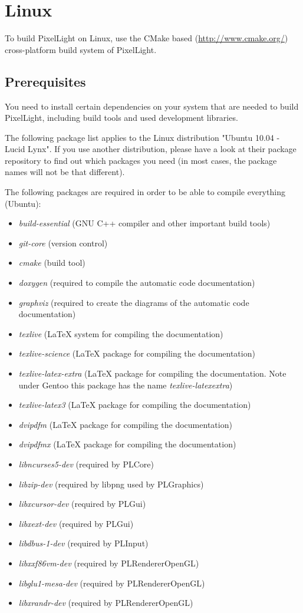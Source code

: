 \chapter{Linux}
To build PixelLight on Linux, use the CMake based (\url{http://www.cmake.org/}) cross-platform build system of PixelLight.




\section{Prerequisites}
You need to install certain dependencies on your system that are needed to build PixelLight, including build tools and used development libraries.

The following package list applies to the Linux distribution "Ubuntu 10.04 - Lucid Lynx". If you use another distribution, please have a look at their package repository to find out which packages you need (in most cases, the package names will not be that different).

The following packages are required in order to be able to compile everything (Ubuntu):
\begin{itemize}
\item{\emph{build-essential} (GNU C++ compiler and other important build tools)}
\item{\emph{git-core} (version control)}
\item{\emph{cmake} (build tool)}
\item{\emph{doxygen} (required to compile the automatic code documentation)}
\item{\emph{graphviz} (required to create the diagrams of the automatic code documentation)}
\item{\emph{texlive} (\LaTeX{} system for compiling the documentation)}
\item{\emph{texlive-science} (\LaTeX{} package for compiling the documentation)}
\item{\emph{texlive-latex-extra} (\LaTeX{} package for compiling the documentation. Note under Gentoo this package has the name \emph{texlive-latexextra})}
\item{\emph{texlive-latex3} (\LaTeX{} package for compiling the documentation)}
\item{\emph{dvipdfm} (\LaTeX{} package for compiling the documentation)}
\item{\emph{dvipdfmx} (\LaTeX{} package for compiling the documentation)}
\item{\emph{libncurses5-dev} (required by PLCore)}
\item{\emph{libzip-dev} (required by libpng used by PLGraphics)}
\item{\emph{libxcursor-dev} (required by PLGui)}
\item{\emph{libxext-dev} (required by PLGui)}
\item{\emph{libdbus-1-dev} (required by PLInput)}
\item{\emph{libxxf86vm-dev} (required by PLRendererOpenGL)}
\item{\emph{libglu1-mesa-dev} (required by PLRendererOpenGL)}
\item{\emph{libxrandr-dev} (required by PLRendererOpenGL)}
\end{itemize}

